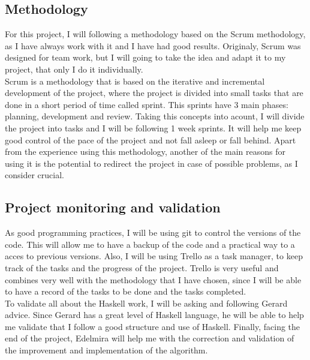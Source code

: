 \subsection{Methodology}
For this project, I will following a methodology based on the Scrum methodology, as I have always work with it and I have had good results.
Originaly, Scrum was designed for team work, but I will going to take the idea and adapt it to my project, that only I do it individually. \\

Scrum is a methodology that is based on the iterative and incremental development of the project, where the project is divided into small tasks that are done in a short period of time called sprint.
This sprints have 3 main phases: planning, development and review.
Taking this concepts into acount, I will divide the project into tasks and I will be following 1 week sprints.
It will help me keep good control of the pace of the project and not fall asleep or fall behind.
Apart from the experience using this methodology, another of the main reasons for using it is the potential to redirect the project in case of possible problems, as I consider crucial.
\subsection{Project monitoring and validation}
As good programming practices, I will be using git to control the versions of the code.
This will allow me to have a backup of the code and a practical way to a acces to previous versions.
Also, I will be using Trello as a task manager, to keep track of the tasks and the progress of the project.
Trello is very useful and combines very well with the methodology that I have chosen, since I will be able to have a record of the tasks to be done and the tasks completed. \\

To validate all about the Haskell work, I will be asking and following Gerard advice. 
Since Gerard has a great level of Haskell language, he will be able to help me validate that I follow a good structure and use of Haskell.
Finally, facing the end of the project, Edelmira will help me with the correction and validation of the improvement and implementation of the algorithm.





